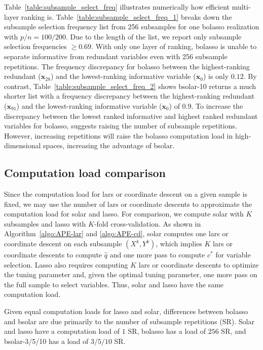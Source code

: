 \documentclass[11pt,review,authoryear]{elsarticle}
\begin{document}
Table~\ref{table:subsample_select_freq} illustrates numerically how efficient multi-layer ranking is. Table~\ref{table:subsample_select_freq_1} breaks down the subsample selection frequency list from 256 subsamples for one bolasso realization with $p/n=100/200$. Due to the length of the list, we report only subsample selection frequencies $\ge0.69$. With only one layer of ranking, bolasso is unable to separate informative from redundant variables even with 256 subsample repetitions. The frequency discrepancy for bolasso between the highest-ranking redundant ($\mathbf{x}_{28}$) and the lowest-ranking informative variable ($\mathbf{x}_0$) is only $0.12$. By contrast, Table~\ref{table:subsample_select_freq_2} shows bsolar-10 returns a much shorter list with a frequency discrepancy between the highest-ranking redundant ($\mathbf{x}_{91}$) and the lowest-ranking informative variable ($\mathbf{x}_0$) of $0.9$. To increase the discrepancy between the lowest ranked informative and highest ranked redundant variables for bolasso, \citet{bach2008bolasso} suggests raising the number of subsample repetitions. However, increasing repetitions will raise the bolasso computation load in high-dimensional spaces, increasing the advantage of bsolar.

\subsection{Computation load comparison \label{subsection:comp}}

Since the computation load for lars or coordinate descent on a given sample is fixed, we may use the number of lars or coordinate descents to approximate the computation load for solar and lasso. For comparison, we compute solar with $K$ subsamples and lasso with $K$-fold cross-validation. As shown in Algorithm~\ref{algo:APE-lar} and \ref{algo:APE-cd}, solar computes one lars or coordinate descent on each subsample $(X^k, Y^k)$, which implies $K$ lars or coordinate descents to compute $\widehat{q}$ and one more pass to compute $c^*$ for variable selection. Lasso also requires computing $K$ lars or coordinate descents to optimize the tuning parameter and, given the optimal tuning parameter, one more pass on the full sample to select variables. Thus, solar and lasso have the same computation load.

Given equal computation loads for lasso and solar, differences between bolasso and bsolar are due primarily to the number of subsample repetitions (SR). Solar and lasso have a computation load of $1$ SR, bolasso has a load of $256$ SR, and bsolar-3/5/10 has a load of $3/5/10$ SR.
\end{document}
